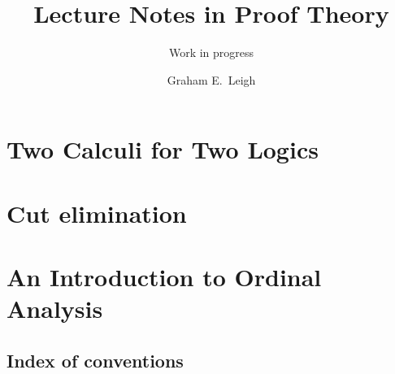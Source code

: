 \documentclass[%
	paper=174mm:247mm,
	DIV=11,
	leqno,
	titlepage,
	headsepline,
	headsepline=false,
	dynindent,
	dynnumwidth,
	toc=bib,
	toc=sectionentrywithoutdots,
	toc=chapterentrywithoutdots,
	oneside,
	bookmark,
	unicode
	]%
	{scrbook}
\title{Lecture Notes in Proof Theory}
\subtitle{Work in progress}
\author{Graham E.\ Leigh}
\begin{document}
\frontmatter
\maketitle



\tableofcontents

\mainmatter



\part{Two Calculi for Two Logics}
\label{module-1}




\part{Cut elimination}
\label{module-2}





\part{An Introduction to Ordinal Analysis}
\label{module-3}





%
%
%

\backmatter


\chapter{Index of conventions}


\end{document}
